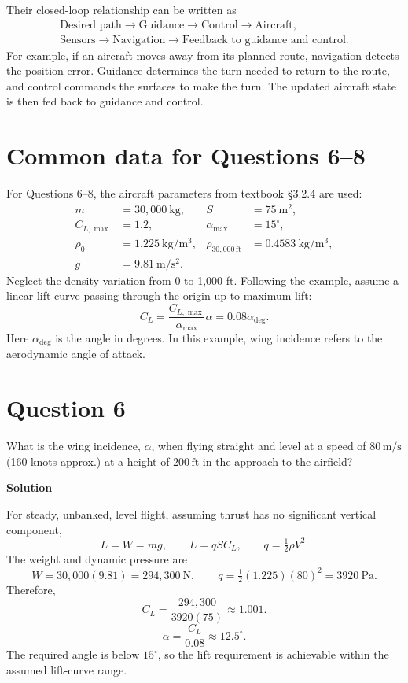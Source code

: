 \documentclass[12pt,a4paper]{article}
\begin{document}
Their closed-loop relationship can be written as
\[
\begin{gathered}
\text{Desired path}
\longrightarrow \text{Guidance}
\longrightarrow \text{Control}
\longrightarrow \text{Aircraft},\\[0.4em]
\text{Sensors}\longrightarrow\text{Navigation}
\longrightarrow\text{Feedback to guidance and control}.
\end{gathered}
\]
For example, if an aircraft moves away from its planned route, navigation detects
the position error. Guidance determines the turn needed to return to the route,
and control commands the surfaces to make the turn. The updated aircraft state
is then fed back to guidance and control.

\newpage
\section*{Common data for Questions 6--8}
For Questions 6--8, the aircraft parameters from textbook \S3.2.4 are used:
\[
\begin{aligned}
m&=30{,}000\ \mathrm{kg}, & S&=75\ \mathrm{m^2},\\
C_{L,\max}&=1.2, & \alpha_{\max}&=15^\circ,\\
\rho_{0}&=1.225\ \mathrm{kg/m^3}, &
\rho_{30{,}000\,\mathrm{ft}}&=0.4583\ \mathrm{kg/m^3},\\
g&=9.81\ \mathrm{m/s^2}. &&
\end{aligned}
\]
Neglect the density variation from 0 to 1,000 ft. Following the example, assume
a linear lift curve passing through the origin up to maximum lift:
\[
C_L=\frac{C_{L,\max}}{\alpha_{\max}}\alpha
=0.08\alpha_{\mathrm{deg}}.
\]
Here $\alpha_{\mathrm{deg}}$ is the angle in degrees. In this example, wing incidence
refers to the aerodynamic angle of attack.

\section*{Question 6}
What is the wing incidence, $\alpha$, when flying straight and level at a speed of
$80\,\mathrm{m/s}$ (160 knots approx.) at a height of $200\,\mathrm{ft}$ in the
approach to the airfield?

\textbf{Solution}

For steady, unbanked, level flight, assuming thrust has no significant vertical
component,
\[
L=W=mg,\qquad L=qSC_L,\qquad q=\tfrac12\rho V^2.
\]
The weight and dynamic pressure are
\[
W=30{,}000(9.81)=294{,}300\ \mathrm{N},
\qquad q=\tfrac12(1.225)(80)^2=3920\ \mathrm{Pa}.
\]
Therefore,
\[
C_L=\frac{294{,}300}{3920(75)}\approx1.001.
\]
\[
\boxed{\alpha=\frac{C_L}{0.08}\approx12.5^\circ.}
\]
The required angle is below $15^\circ$, so the lift requirement is achievable
within the assumed lift-curve range.
\end{document}
